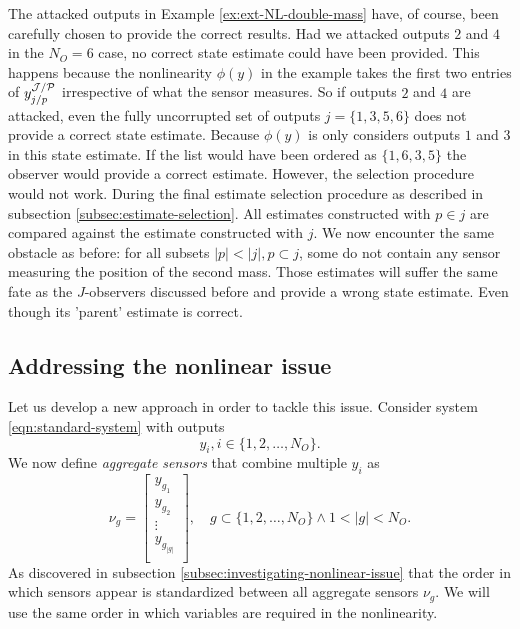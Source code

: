 The attacked outputs in Example \ref{ex:ext-NL-double-mass} have, of course, been carefully chosen to provide the correct results. Had we attacked outputs $2$ and $4$ in the $N_O=6$ case, no correct state estimate could have been provided. This happens because the nonlinearity $\phi(y)$ in the example takes the first two entries of $y^{\mathcal{J}/\mathcal{P}}_{j/p}$ irrespective of what the sensor measures. So if outputs $2$ and $4$ are attacked, even the fully uncorrupted set of outputs $j=\{1,3,5,6\}$ does not provide a correct state estimate. Because $\phi(y)$ is only considers outputs $1$ and $3$ in this state estimate. If the list would have been ordered as $\{1,6,3,5\}$ the observer would provide a correct estimate. However, the selection procedure would not work. During the final estimate selection procedure as described in subsection \ref{subsec:estimate-selection}. All estimates constructed with $p \in j$ are compared against the estimate constructed with $j$. We now encounter the same obstacle as before: for all subsets $|p| < |j|, p \subset j$, some do not contain any sensor measuring the position of the second mass. Those estimates will suffer the same fate as the $J$-observers discussed before and provide a wrong state estimate. Even though its 'parent' estimate is correct.

\subsection{Addressing the nonlinear issue}
Let us develop a new approach in order to tackle this issue. Consider system \eqref{eqn:standard-system} with outputs
\begin{equation*}
    y_i, i \in \{1,2,\dots,N_O\}.
\end{equation*}
We now define \textit{aggregate sensors} that combine multiple $y_i$ as
\begin{equation}
    \nu_g = 
    \begin{bmatrix}
        y_{g_1} \\ y_{g_2} \\ \vdots \\ y_{g_{|g|}} \\
    \end{bmatrix}
    , \quad g \subset \{1,2,\dots,N_O\} \wedge 1 < |g| < N_O.
\end{equation}
As discovered in subsection \ref{subsec:investigating-nonlinear-issue} that the order in which sensors appear is standardized between all aggregate sensors $\nu_g$. We will use the same order in which variables are required in the nonlinearity.


